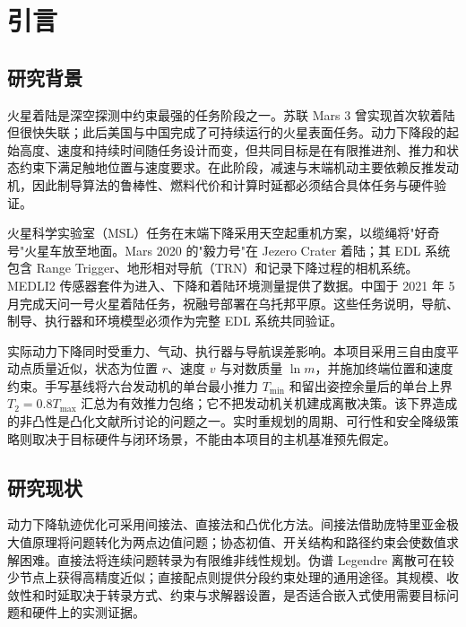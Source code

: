 \section{引言}

\subsection{研究背景}

火星着陆是深空探测中约束最强的任务阶段之一。苏联 Mars 3 曾实现首次软着陆但很快失联；此后美国与中国完成了可持续运行的火星表面任务\cite{nasaNssdcMars3,govTianwen2021}。动力下降段的起始高度、速度和持续时间随任务设计而变，但共同目标是在有限推进剂、推力和状态约束下满足触地位置与速度要求\cite{braun2007mars}。在此阶段，减速与末端机动主要依赖反推发动机，因此制导算法的鲁棒性、燃料代价和计算时延都必须结合具体任务与硬件验证。

火星科学实验室（MSL）任务在末端下降采用天空起重机方案，以缆绳将"好奇号"火星车放至地面\cite{steltzner2013msl}。Mars 2020 的"毅力号"在 Jezero Crater 着陆；其 EDL 系统包含 Range Trigger、地形相对导航（TRN）和记录下降过程的相机系统\cite{chen2021mars2020}。MEDLI2 传感器套件为进入、下降和着陆环境测量提供了数据。中国于 2021 年 5 月完成天问一号火星着陆任务，祝融号部署在乌托邦平原\cite{govTianwen2021}。这些任务说明，导航、制导、执行器和环境模型必须作为完整 EDL 系统共同验证。

实际动力下降同时受重力、气动、执行器与导航误差影响。本项目采用三自由度平动点质量近似，状态为位置 $r$、速度 $v$ 与对数质量 $\ln m$，并施加终端位置和速度约束。手写基线将六台发动机的单台最小推力 $T_{\min}$ 和留出姿控余量后的单台上界 $T_2=0.8T_{\max}$ 汇总为有效推力包络；它不把发动机关机建成离散决策。该下界造成的非凸性是凸化文献所讨论的问题之一\cite{acikmese2007lossless}。实时重规划的周期、可行性和安全降级策略则取决于目标硬件与闭环场景，不能由本项目的主机基准预先假定。

\subsection{研究现状}

动力下降轨迹优化可采用间接法、直接法和凸优化方法。间接法借助庞特里亚金极大值原理将问题转化为两点边值问题；协态初值、开关结构和路径约束会使数值求解困难。直接法将连续问题转录为有限维非线性规划。伪谱 Legendre 离散可在较少节点上获得高精度近似\cite{el2009legendre}；直接配点则提供分段约束处理的通用途径\cite{benson2003direct}。其规模、收敛性和时延取决于转录方式、约束与求解器设置，是否适合嵌入式使用需要目标问题和硬件上的实测证据。

